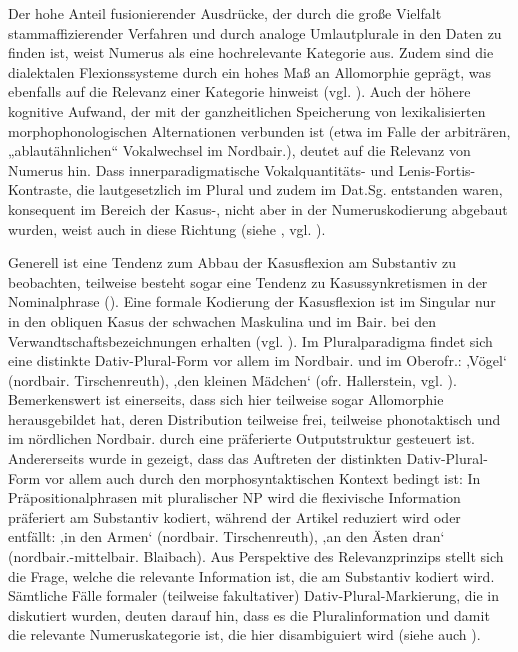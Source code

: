 Der hohe Anteil fusionierender Ausdrücke, der durch die große Vielfalt stammaffizierender Verfahren und durch analoge Umlautplurale in den Daten zu finden ist, weist Numerus als eine hochrelevante Kategorie aus. Zudem sind die dialektalen Flexionssysteme durch ein hohes Maß an Allomorphie geprägt, was ebenfalls auf die Relevanz einer Kategorie hinweist (vgl.
\citealt{DammelNübling2006}). Auch der höhere kognitive Aufwand, der mit der ganzheitlichen Speicherung von lexikalisierten morphophonologischen Alternationen verbunden ist (etwa im Falle der arbiträren, „ablautähnlichen“ Vokalwechsel im Nordbair.), deutet auf die Relevanz von Numerus hin. Dass innerparadigmatische Vokalquantitäts- und Lenis-Fortis-Kontraste, die lautgesetzlich im Plural und zudem im Dat.Sg. entstanden waren, konsequent im Bereich der Kasus-, nicht aber in der Numeruskodierung abgebaut wurden, weist auch in diese Richtung (siehe , vgl. \citealt[63--65]{Birkenes2014}).

Generell ist eine Tendenz zum Abbau der Kasusflexion am Substantiv zu beobachten, teilweise besteht sogar eine Tendenz zu Kasussynkretismen in der Nominalphrase (). Eine formale Kodierung der Kasusflexion ist im Singular nur in den obliquen Kasus der schwachen Maskulina und im Bair. bei den Verwandtschaftsbezeichnungen erhalten (vgl. ). Im Pluralparadigma findet sich eine distinkte Dativ-Plural-Form vor allem im Nordbair. und im Oberofr.:  ‚Vögel‘
(nordbair. Tirschenreuth),    ‚den kleinen Mädchen‘ (ofr. Hallerstein, vgl. ). Bemerkenswert ist einerseits, dass sich hier teilweise sogar Allomorphie herausgebildet hat, deren Distribution teilweise frei, teilweise phonotaktisch und im nördlichen Nordbair. durch eine präferierte Outputstruktur gesteuert ist. Andererseits wurde in  gezeigt, dass das Auftreten der distinkten Dativ-Plural-Form vor allem auch durch den morphosyntaktischen Kontext bedingt ist: In Präpositionalphrasen mit pluralischer NP wird die flexivische Information präferiert am Substantiv kodiert, während der Artikel reduziert wird oder entfällt:   ‚in den Armen‘ (nordbair. Tirschenreuth),    ‚an den Ästen dran‘ (nordbair.-mittelbair. Blaibach). Aus Perspektive des Relevanzprinzips stellt sich die Frage, welche die relevante Information ist, die am Substantiv kodiert wird. Sämtliche Fälle formaler (teilweise fakultativer) Dativ-Plural-Markierung, die in  diskutiert wurden, deuten darauf hin, dass es die Pluralinformation und damit die relevante Numeruskategorie ist, die hier dis\-ambiguiert wird (siehe auch ).

